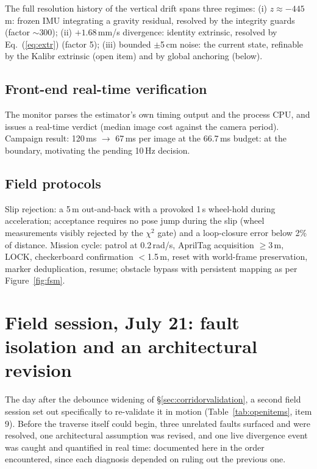 The full resolution history of the vertical drift spans three regimes:
(i) $z\approx-445$\,m: frozen IMU integrating a gravity residual, resolved
by the integrity guards (factor $\sim$300); (ii) $+1.68$\,mm/s divergence:
identity extrinsic, resolved by Eq.~(\ref{eq:extr}) (factor 5);
(iii) bounded $\pm$5\,cm noise: the current state, refinable by the Kalibr
extrinsic (open item) and by global anchoring (below).

\subsection{Front-end real-time verification}
The monitor  parses the estimator's own
timing output and the process CPU, and issues a real-time verdict (median
image cost against the camera period). Campaign result: 120\,ms
$\rightarrow$ 67\,ms per image at the 66.7\,ms budget: at the boundary,
motivating the pending 10\,Hz decision.

\subsection{Field protocols}
Slip rejection: a 5\,m out-and-back with a provoked 1\,s wheel-hold during
acceleration; acceptance requires no pose jump during the slip (wheel
measurements visibly rejected by the $\chi^2$ gate) and a loop-closure error
below 2\% of distance. Mission cycle: patrol at 0.2\,rad/s, AprilTag
acquisition $\ge$3\,m, LOCK, checkerboard confirmation $<$1.5\,m, reset with
world-frame preservation, marker deduplication, resume; obstacle bypass with
persistent mapping as per Figure~\ref{fig:fsm}.

\section{Field session, July 21: fault isolation and an architectural revision}
\label{sec:july21}

The day after the debounce widening of \S\ref{sec:corridorvalidation}, a
second field session set out specifically to re-validate it in motion
(Table~\ref{tab:openitems}, item 9). Before the traverse itself could begin,
three unrelated faults surfaced and were resolved, one architectural
assumption was revised, and one live divergence event was caught and
quantified in real time: documented here in the order encountered, since
each diagnosis depended on ruling out the previous one.

